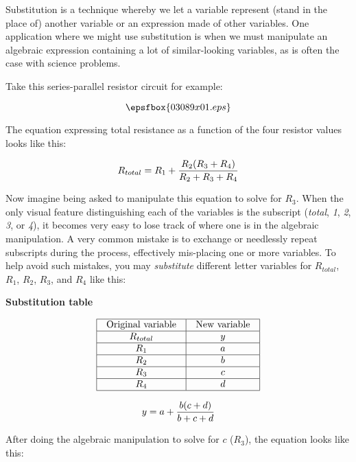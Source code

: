

Substitution is a technique whereby we let a variable represent (stand in the place of) another variable or an expression made of other variables.  One application where we might use substitution is when we must manipulate an algebraic expression containing a lot of similar-looking variables, as is often the case with science problems.

Take this series-parallel resistor circuit for example:

$$\epsfbox{03089x01.eps}$$

The equation expressing total resistance as a function of the four resistor values looks like this:

$$R_{total} = R_1 + {{R_2 (R_3 + R_4)} \over {R_2 + R_3 + R_4}}$$

Now imagine being asked to manipulate this equation to solve for $R_3$.  When the only visual feature distinguishing each of the variables is the subscript ({\it total}, {\it 1}, {\it 2}, {\it 3}, or {\it 4}), it becomes very easy to lose track of where one is in the algebraic manipulation.  A very common mistake is to exchange or needlessly repeat subscripts during the process, effectively mis-placing one or more variables.  To help avoid such mistakes, you may {\it substitute} different letter variables for $R_{total}$, $R_1$, $R_2$, $R_3$, and $R_4$ like this:

\vskip 10pt

\centerline{\bf Substitution table}


$$\vbox{\offinterlineskip
\halign{\strut
\vrule \quad\hfil # \ \hfil & 
\vrule \quad\hfil # \ \hfil \vrule \cr
\noalign{\hrule}
%
Original variable & New variable \cr
%
\noalign{\hrule}
%
$R_{total}$ & $y$ \cr
%
\noalign{\hrule}
%
$R_1$ & $a$ \cr
%
\noalign{\hrule}
%
$R_2$ & $b$ \cr
%
\noalign{\hrule}
%
$R_3$ & $c$ \cr
%
\noalign{\hrule}
%
$R_4$ & $d$ \cr
%
\noalign{\hrule}
} %
}$$ %

$$y = a + {{b (c + d)} \over {b + c + d}}$$

After doing the algebraic manipulation to solve for $c$ ($R_3$), the equation looks like this:


